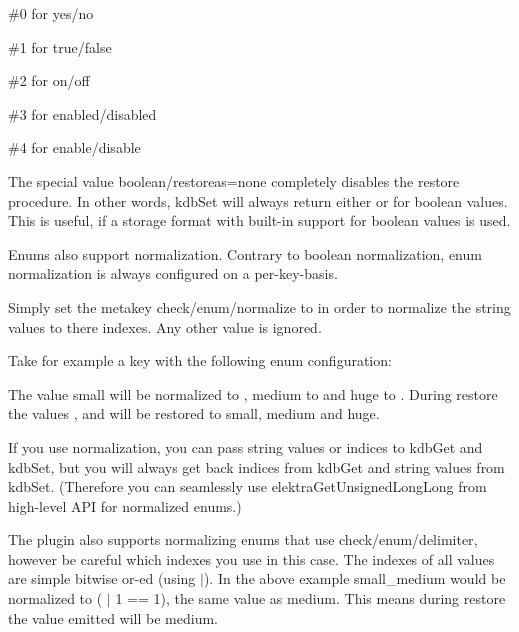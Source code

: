 \begin{DoxyItemize}
\item {\ttfamily \#0} for {\ttfamily yes}/{\ttfamily no}
\item {\ttfamily \#1} for {\ttfamily true}/{\ttfamily false}
\item {\ttfamily \#2} for {\ttfamily on}/{\ttfamily off}
\item {\ttfamily \#3} for {\ttfamily enabled}/{\ttfamily disabled}
\item {\ttfamily \#4} for {\ttfamily enable}/{\ttfamily disable}
\end{DoxyItemize}

The special value {\ttfamily boolean/restoreas=none} completely disables the restore procedure. In other words, {\ttfamily kdb\+Set} will always return either {} or {} for boolean values. This is useful, if a storage format with built-\/in support for boolean values is used.

Enums also support normalization. Contrary to boolean normalization, enum normalization is always configured on a per-\/key-\/basis.

Simply set the metakey {\ttfamily check/enum/normalize} to {} in order to normalize the string values to there indexes. Any other value is ignored.

Take for example a key with the following enum configuration\+:


\begin{DoxyCode}{0}
\end{DoxyCode}


The value {\ttfamily small} will be normalized to {}, {\ttfamily medium} to {} and {\ttfamily huge} to {}. During restore the values {}, {} and {} will be restored to {\ttfamily small}, {\ttfamily medium} and {\ttfamily huge}.

If you use normalization, you can pass string values or indices to {\ttfamily kdb\+Get} and {\ttfamily kdb\+Set}, but you will always get back indices from {\ttfamily kdb\+Get} and string values from {\ttfamily kdb\+Set}. (Therefore you can seamlessly use {\ttfamily elektra\+Get\+Unsigned\+Long\+Long} from high-\/level A\+PI for normalized enums.)

The plugin also supports normalizing enums that use {\ttfamily check/enum/delimiter}, however be careful which indexes you use in this case. The indexes of all values are simple bitwise or-\/ed (using {\ttfamily $\vert$}). In the above example {\ttfamily small\+\_\+medium} would be normalized to {} ({ $\vert$ 1 == 1}), the same value as {\ttfamily medium}. This means during restore the value emitted will be {\ttfamily medium}.

